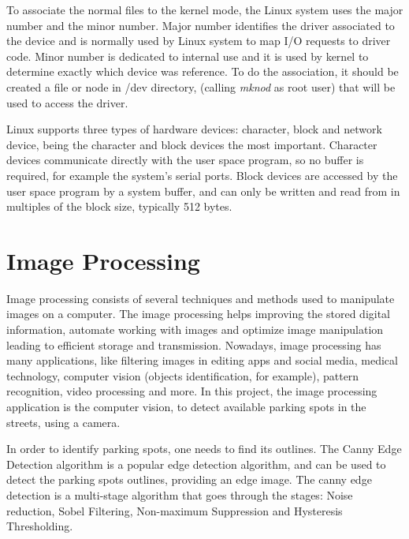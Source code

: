 To associate the normal files to the kernel mode, the Linux system uses the major number and the minor number. Major number identifies the driver associated to the device and is normally used by Linux system to map I/O requests to driver code. Minor number is dedicated to internal use and it is used by kernel to determine exactly which device was reference. To do the association, it should be created a file or node in /dev directory, (calling \textit{mknod} as root user) that will be used to access the driver.

Linux supports three types of hardware devices: character, block and network device, being the character and block devices the most important. Character devices communicate directly with the user space program, so no buffer is required, for example the system’s serial ports. Block devices are accessed by the user space program by a system buffer, and can only be written and read from in multiples of the block size, typically 512 bytes. \cite{linux_progr_interface}

\clearpage
\section{Image Processing}

Image processing consists of several techniques and methods used to manipulate images on a computer. The image processing helps improving the stored digital information, automate working with images and optimize image manipulation leading to efficient storage and transmission. Nowadays, image processing has many applications, like filtering images in editing apps and social media, medical technology, computer vision (objects identification, for example), pattern recognition, video processing and more. In this project, the image processing application is the computer vision, to detect available parking spots in the streets, using a camera.

In order to identify parking spots, one needs to find its outlines. The Canny Edge Detection \cite{canny} algorithm is a popular edge detection algorithm, and can be used to detect the parking spots outlines, providing an edge image. The canny edge detection is a multi-stage algorithm that goes through the stages: Noise reduction, Sobel Filtering, Non-maximum Suppression and Hysteresis Thresholding.

